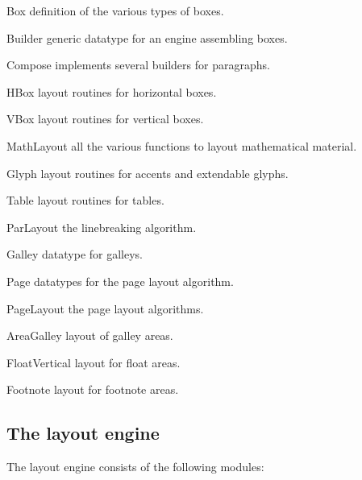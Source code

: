 \begin{description}
%
\item{\textsf{\red Box}}%
  definition of the various types of boxes.
\item{\textsf{\red Builder}}%
  generic datatype for an engine assembling boxes.
\item{\textsf{\red Compose}}%
  implements several builders for paragraphs.
\item{\textsf{\red HBox}}%
  layout routines for horizontal boxes.
\item{\textsf{\red VBox}}%
  layout routines for vertical boxes.
\item{\textsf{\red MathLayout}}%
  all the various functions to layout mathematical material.
\item{\textsf{\red Glyph}}%
  layout routines for accents and extendable glyphs.
\item{\textsf{\red Table}}%
  layout routines for tables.
\item{\textsf{\red ParLayout}}%
  the linebreaking algorithm.
\item{\textsf{\red Galley}}%
  datatype for galleys.
\item{\textsf{\red Page}}%
  datatypes for the page layout algorithm.
\item{\textsf{\red PageLayout}}%
  the page layout algorithms.
\item{\textsf{\red AreaGalley}}%
  layout of galley areas.
\item{\textsf{\red FloatVertical}}%
  layout for float areas.
\item{\textsf{\red Footnote}}%
  layout for footnote areas.
\end{description}

\subsection{The layout engine}   %

The layout engine consists of the following modules\?:

